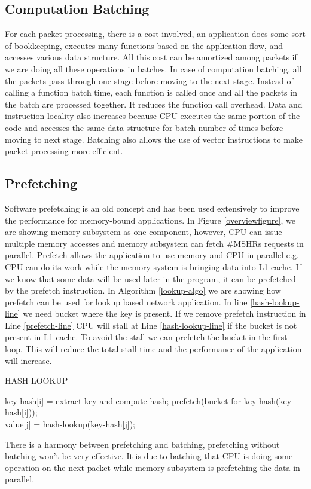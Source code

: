 \subsection{Computation Batching}
\label{computationbatching}
For each packet processing, there is a cost involved, an application does some sort of bookkeeping, executes many functions based on the application flow, and accesses various data structure. All this cost can be amortized among packets if we are doing all these operations in batches. In case of computation batching, all the packets pass through one stage before moving to the next stage. Instead of calling a function batch time, each function is called once and all the packets in the batch are processed together. It reduces the function call overhead. Data and instruction locality also increases because CPU executes the same portion of the code and accesses the same data structure for batch number of times before moving to next stage. Batching also allows the use of vector instructions to make packet processing more efficient.

\subsection{Prefetching}
\label{prefetching}
Software prefetching is an old concept and has been used extensively to improve the performance for memory-bound applications. In Figure \ref{overviewfigure}, we are showing memory subsystem as one component, however, CPU can issue multiple memory accesses and memory subsystem can fetch \#MSHRs requests in parallel. Prefetch allows the application to use memory and CPU in parallel e.g. CPU can do its work while the memory system is bringing data into L1 cache. If we know that some data will be used later in the program, it can be prefetched by the prefetch instruction. In Algorithm \ref{lookup-algo} we are showing how prefetch can be used for lookup based network application. In line \ref{hash-lookup-line} we need bucket where the key is present. If we remove prefetch instruction in Line \ref{prefetch-line} CPU will stall at Line \ref{hash-lookup-line} if the bucket is not present in L1 cache. To avoid the stall we can prefetch the bucket in the first loop. This will reduce the total stall time and the performance of the application will increase.

\begin{algorithm}[H]
 \caption{HASH LOOKUP}
 \label{lookup-algo}
 \begin{algorithmic}[1]
     \State key-hash[i] = extract key and compute hash; \label{hash-compute-line}
     \State prefetch(bucket-for-key-hash(key-hash[i])); \label{prefetch-line}
 \EndFor
 \\
     \State value[j] = hash-lookup(key-hash[j]); \label{hash-lookup-line}
 \EndFor
 \end{algorithmic}
\end{algorithm}
There is a harmony between prefetching and batching, prefetching without batching won't be very effective. It is due to batching that CPU is doing some operation on the next packet while memory subsystem is prefetching the data in parallel.

